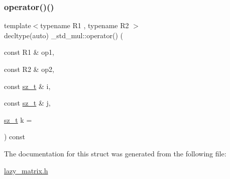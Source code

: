 \subsubsection{\texorpdfstring{operator()()}{operator()()}}
{\footnotesize\ttfamily template$<$typename R1 , typename R2 $>$ \\
decltype(auto) \+\_\+std\+\_\+mul\+::operator() (\begin{DoxyParamCaption}\item[{const R1 \&}]{op1,  }\item[{const R2 \&}]{op2,  }\item[{const \mbox{\hyperlink{lazy__matrix_8h_acba2745dcfc55b2d05ff45adc6a0a015}{sz\+\_\+t}} \&}]{i,  }\item[{const \mbox{\hyperlink{lazy__matrix_8h_acba2745dcfc55b2d05ff45adc6a0a015}{sz\+\_\+t}} \&}]{j,  }\item[{\mbox{\hyperlink{lazy__matrix_8h_acba2745dcfc55b2d05ff45adc6a0a015}{sz\+\_\+t}}}]{k = {} }\end{DoxyParamCaption}) const\hspace{0.3cm}{\ttfamily [inline]}}



The documentation for this struct was generated from the following file\+:\begin{DoxyCompactItemize}
\item 
\mbox{\hyperlink{lazy__matrix_8h}{lazy\+\_\+matrix.\+h}}\end{DoxyCompactItemize}

